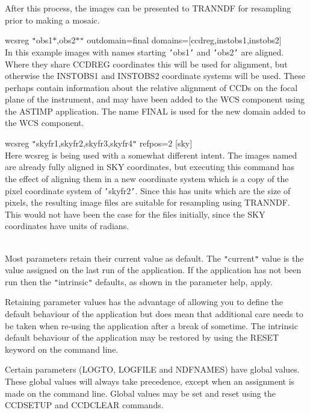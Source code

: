 \documentclass[twoside,11pt]{article}
\newcommand{\htmlref}[2]{#1}
\renewcommand{\_}{\texttt{\symbol{95}}}
\newcommand{\qt}[1]{{\tt "}#1{\tt "}}
\newcommand{\xroutine}[1]{\htmlref{{\sc #1}}{#1}}
\newcommand{\sstexamplesubsection}[2]{\sloppy \item{\ssttt #1} \mbox{} \\ #2 }
\newcommand{\sstdiytopic}[2]{\item[#1:] \mbox{} \\[1.3ex] #2}
\newcommand{\sstexamplesubsection}[2]{\item[{\ssttt #1}] #2}
\newcommand{\sstdiytopic}[2]{\item[{#1}] #2 }
\begin{document}
{{{         After this process, the images can be presented to TRANNDF for
         resampling prior to making a mosaic.
      }
      \sstexamplesubsection{
         wcsreg {\tt "}obs1\_$*$,obs2\_$*${\tt "} outdomain=final
             domains=[ccd\_reg,inst\_obs1,inst\_obs2]
      }{
         In this example images with names starting {\tt '}obs1\_{\tt '} and {\tt '}obs2\_{\tt '} are aligned.
         Where they share CCD\_REG coordinates this will be used for
         alignment, but otherwise the INST\_OBS1 and INST\_OBS2
         coordinate systems will be used.  These perhaps contain
         information about the relative alignment of CCDs on the focal
         plane of the instrument, and may have been added to the WCS
         component using the ASTIMP application.  The name FINAL is
         used for the new domain added to the WCS component.
      }
      \sstexamplesubsection{
         wcsreg {\tt "}skyfr1,skyfr2,skyfr3,skyfr4{\tt "} refpos=2 [sky]
      }{
         Here wcsreg is being used with a somewhat different intent.
         The images named are already fully aligned in  SKY
         coordinates, but executing this command has the effect of
         aligning them in a new coordinate system which is a copy of
         the pixel coordinate system of {\tt '}skyfr2{\tt '}.  Since this has
         units which are the size of pixels, the resulting image files
         are suitable for resampling using TRANNDF.  This would not
         have been the case for the files initially, since the SKY
         coordinates have units of radians.
      }
   }
   \sstdiytopic{
      Behaviour of parameters
   } {
      Most parameters retain their current value as default. The
      \qt{current} value is the value assigned on the last run of the
      application. If the application has not been run then the
      \qt{intrinsic} defaults, as shown in the parameter help, apply.

      Retaining parameter values has the advantage of allowing you to
      define the default behaviour of the application but does mean
      that additional care needs to be taken when re-using the
      application after a break of sometime. The intrinsic default
      behaviour of the application may be restored by using the RESET
      keyword on the command line.

      Certain parameters (LOGTO, LOGFILE and NDFNAMES) have global
      values. These global values will always take precedence, except
      when an assignment is made on the command line.  Global values may
      be set and reset using the \xroutine{CCDSETUP} and
      \xroutine{CCDCLEAR} commands.
   }
}
\end{document}
